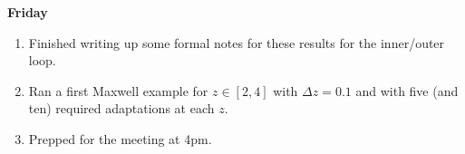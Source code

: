\documentclass[12pt,a4paper]{article}
\begin{document}
\textbf{Friday}
\begin{enumerate}
    \item Finished writing up some formal notes for these results for the inner/outer loop.
    \item Ran a first Maxwell example for $z \in [2, 4]$ with $\Delta z= 0.1$ and with five (and ten) required adaptations at each $z.$
    \item Prepped for the meeting at 4pm.
\end{enumerate}








\end{document}
